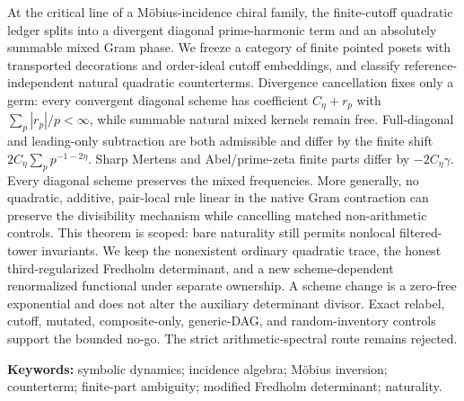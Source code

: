At the critical line of a M\"obius-incidence chiral family, the finite-cutoff
quadratic ledger splits into a divergent diagonal prime-harmonic term and an
absolutely summable mixed Gram phase.  We freeze a category of finite pointed
posets with transported decorations and order-ideal cutoff embeddings, and
classify reference-independent natural quadratic counterterms.  Divergence
cancellation fixes only a germ: every convergent diagonal scheme has
coefficient $C_\eta+r_p$ with $\sum_p|r_p|/p<\infty$, while summable natural
mixed kernels remain free.  Full-diagonal and leading-only subtraction are
both admissible and differ by the finite shift
$2C_\eta\sum_pp^{-1-2\eta}$.  Sharp Mertens and Abel/prime-zeta finite parts
differ by $-2C_\eta\gamma$.  Every diagonal scheme preserves the mixed
frequencies.  More generally, no quadratic, additive, pair-local rule linear
in the native Gram contraction can preserve the divisibility mechanism while
cancelling matched non-arithmetic controls.  This theorem is scoped: bare
naturality still permits nonlocal filtered-tower invariants.  We keep the
nonexistent ordinary quadratic trace, the honest third-regularized Fredholm
determinant, and a new scheme-dependent renormalized functional under
separate ownership.  A scheme change is a zero-free exponential and does not
alter the auxiliary determinant divisor.  Exact relabel, cutoff, mutated,
composite-only, generic-DAG, and random-inventory controls support the bounded
no-go.  The strict arithmetic-spectral route remains rejected.

\medskip\noindent
\textbf{Keywords:} symbolic dynamics; incidence algebra; M\"obius inversion;
counterterm; finite-part ambiguity; modified Fredholm determinant; naturality.
